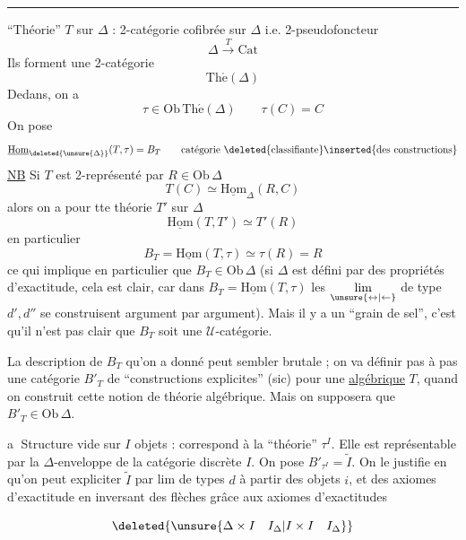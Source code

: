 \medskip\hrule\medskip

``Théorie'' $T$ sur $\Delta$ : 2-catégorie cofibrée sur $\Delta$ i.e. 2-pseudofoncteur
\[
\Delta\xrightarrow{T}\mathrm{Cat}
\]
Ils forment une 2-catégorie
\[
\mathrm{Th\acute e}(\Delta)
\]
Dedans, on a
\[
\tau\in\mathrm{Ob}\,\mathrm{Th\acute e}(\Delta)\qquad \tau(C)=C
\]
On pose
\[
\underline{\mathrm{Hom}}_{\deleted{\unsure{\Delta}}}(T,\tau)=B_T\qquad
\text{catégorie \deleted{classifiante}\inserted{des constructions}}
\]
\uline{NB} Si $T$ est 2-représenté par $R\in\mathrm{Ob}\,\Delta$
\[
T(C)\simeq\underline{\mathrm{Hom}}_{\Delta}(R,C)
\]
alors on a  pour tte théorie $T'$ sur $\Delta$
\[
\underline{\mathrm{Hom}}(T,T')\simeq T'(R)
\]
en particulier
\[
B_T=\underline{\mathrm{Hom}}(T,\tau)\simeq\tau(R)=R
\]
ce qui implique en particulier que $B_T\in\mathrm{Ob}\,\Delta$ (si $\Delta$ est défini par des propriétés d'exactitude, cela est clair, car dans $B_T=\underline{\mathrm{Hom}}(T,\tau)$ les $\underset{\unsure{\leftrightarrow|\leftarrow}}{\lim}$ de type $d',d''$ se construisent argument par argument)\unsure{;|}. Mais il y a un ``grain de sel'', c'est qu'il n'est pas clair que $B_T$ soit une $\mathcal U$-catégorie.

La description de $B_T$ qu'on a donné peut sembler brutale ; on va définir pas à pas une catégorie $B'_T$ de ``constructions explicites'' (sic) pour une  \uline{algébrique} $T$, quand on construit cette notion de théorie algébrique. Mais on supposera que $B'_T\in\mathrm{Ob}\,\Delta$.

\textcircled{a} Structure vide sur $I$ objets : correspond à \deleted{\unsure{$\tau$}} la ``théorie'' $\tau^I$. Elle est représentable par la $\Delta$-enveloppe  de la catégorie discrète $I$.  On pose $B'_{\tau^{I}}=\widetilde I$. On le justifie  en  qu'on peut expliciter $\widetilde I$ par lim de types $d$ à partir des objets $i$, et des axiomes d'exactitude en inversant des flèches grâce aux axiomes d'exactitudes

\[
\deleted{\unsure{\Delta\times I\quad I_{\Delta}|I\times I\quad I_{\Delta}}}
\]

